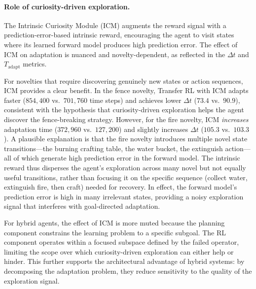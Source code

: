 \paragraph{Role of curiosity-driven exploration.} The Intrinsic Curiosity Module (ICM) augments the reward signal with a prediction-error-based intrinsic reward, encouraging the agent to visit states where its learned forward model produces high prediction error. The effect of ICM on adaptation is nuanced and novelty-dependent, as reflected in the $\Delta t$ and $T_\text{adapt}$ metrics.

For novelties that require discovering genuinely new states or action sequences, ICM provides a clear benefit. In the fence novelty, Transfer RL with ICM adapts faster ($854{,}400$ vs.\ $701{,}760$ time steps) and achieves lower $\Delta t$ ($73.4$ vs.\ $90.9$), consistent with the hypothesis that curiosity-driven exploration helps the agent discover the fence-breaking strategy. However, for the fire novelty, ICM \emph{increases} adaptation time ($372{,}960$ vs.\ $127{,}200$) and slightly increases $\Delta t$ ($105.3$ vs.\ $103.3$). A plausible explanation is that the fire novelty introduces multiple novel state transitions---the burning crafting table, the water bucket, the extinguish action---all of which generate high prediction error in the forward model. The intrinsic reward thus disperses the agent's exploration across many novel but not equally useful transitions, rather than focusing it on the specific sequence (collect water, extinguish fire, then craft) needed for recovery. In effect, the forward model's prediction error is high in many irrelevant states, providing a noisy exploration signal that interferes with goal-directed adaptation.

For hybrid agents, the effect of ICM is more muted because the planning component constrains the learning problem to a specific subgoal. The RL component operates within a focused subspace defined by the failed operator, limiting the scope over which curiosity-driven exploration can either help or hinder. This further supports the architectural advantage of hybrid systems: by decomposing the adaptation problem, they reduce sensitivity to the quality of the exploration signal.



